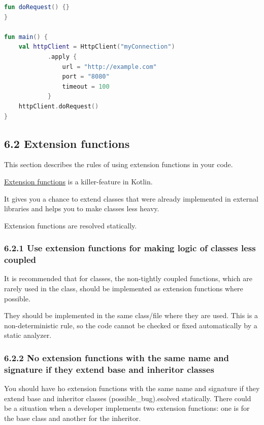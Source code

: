 {{{{\begin{lstlisting}[language=Kotlin]
    fun doRequest() {}
}

fun main() {
    val httpClient = HttpClient("myConnection")
            .apply {
                url = "http://example.com"
                port = "8080"
                timeout = 100
            }
    httpClient.doRequest()
}
\end{lstlisting}


\subsection*{\textbf{6.2 Extension functions}}

This section describes the rules of using extension functions in your code.



\href{https://kotlinlang.org/docs/reference/extensions.html}{Extension functions} is a killer-feature in Kotlin. 

It gives you a chance to extend classes that were already implemented in external libraries and helps you to make classes less heavy.

Extension functions are resolved statically.



\subsubsection*{\textbf{6.2.1 Use extension functions for making logic of classes less coupled}}
\leavevmode\newline

It is recommended that for classes, the non-tightly coupled functions, which are rarely used in the class, should be implemented as extension functions where possible.

They should be implemented in the same class/file where they are used. This is a non-deterministic rule, so the code cannot be checked or fixed automatically by a static analyzer.



\subsubsection*{\textbf{6.2.2 No extension functions with the same name and signature if they extend base and inheritor classes}}
\leavevmode\newline

You should have ho extension functions with the same name and signature if they extend base and inheritor classes (possible\_bug).esolved statically. There could be a situation when a developer implements two extension functions: one is for the base class and another for the inheritor.

}}}}

